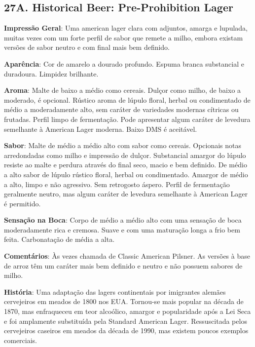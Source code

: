 \subsection*{27A. Historical Beer: Pre-Prohibition Lager}

\textbf{Impressão Geral}: Uma american lager clara com adjuntos, amarga e lupulada, muitas vezes com um forte perfil de sabor que remete a milho, embora existam versões de sabor neutro e com final mais bem definido.

\textbf{Aparência}: Cor de amarelo a dourado profundo. Espuma branca substancial e duradoura. Limpidez brilhante.

\textbf{Aroma}: Malte de baixo a médio como cereais. Dulçor como milho, de baixo a moderado, é opcional. Rústico aroma de lúpulo floral, herbal ou condimentado de médio a moderadamente alto, sem caráter de variedades modernas cítricas ou frutadas. Perfil limpo de fermentação. Pode apresentar algum caráter de levedura semelhante à American Lager moderna. Baixo DMS é aceitável.

\textbf{Sabor}: Malte de médio a médio alto com sabor como cereais. Opcionais notas arredondadas como milho e impressão de dulçor. Substancial amargor do lúpulo resiste ao malte e perdura através do final seco, macio e bem definido. De médio a alto sabor de lúpulo rústico floral, herbal ou condimentado. Amargor de médio a alto, limpo e não agressivo. Sem retrogosto áspero. Perfil de fermentação geralmente neutro, mas algum caráter de levedura semelhante à American Lager é permitido.

\textbf{Sensação na Boca}: Corpo de médio a médio alto com uma sensação de boca moderadamente rica e cremosa. Suave e com uma maturação longa a frio bem feita. Carbonatação de média a alta.

\textbf{Comentários}: Às vezes chamada de Classic American Pilsner. As versões à base de arroz têm um caráter mais bem definido e neutro e não possuem sabores de milho.

\textbf{História}: Uma adaptação das lagers continentais por imigrantes alemães cervejeiros em meados de 1800 nos EUA. Tornou-se mais popular na década de 1870, mas enfraqueceu em teor alcoólico, amargor e popularidade após a Lei Seca e foi amplamente substituída pela Standard American Lager. Ressuscitada pelos cervejeiros caseiros em meados da década de 1990, mas existem poucos exemplos comerciais.

